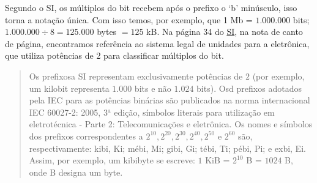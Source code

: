 Segundo o SI, os múltiplos do bit recebem após o prefixo o ‘b’ minúsculo, isso torna a notação única. Com isso temos, por exemplo, que 1 Mb = $1.000.000$ bits; $1.000.000 \div 8 = 125.000$ bytes $=125$ kB. Na página 34 do \href{http://www.inmetro.gov.br/inovacao/publicacoes/si\_versao\_final.pdf}{SI}, na nota de canto de página, encontramos referência ao sistema legal de unidades para a eletrônica, que utiliza potências de 2 para classificar múltiplos do bit.

\begin{quote}
Os prefixosa SI representam exclusivamente potências de $2$ (por exemplo, um kilobit representa $1.000$ bits e não $1.024$ bits). Osd prefixos adotados pela IEC para as potências binárias são publicados na norma internacional IEC 60027-2: 2005, 3$^{\text{a}}$ edição, símbolos literais para utilização em eletrotécnica - Parte 2: Telecomunicações e eletrônica. Os nomes e símbolos dos prefixos correspondentes a $2^{10}, 2^{20}, 2^{30}, 2^{40}, 2^{50} \text{ e } 2^{60}$ são, respectivamente: kibi, Ki; mébi, Mi; gibi, Gi; tébi, Ti; pébi, Pi; e exbi, Ei. Assim, por exemplo, um kibibyte se escreve: $1$ KiB = $2^{10}$ B = $1024$ B, onde B designa um byte. 
\end{quote}
